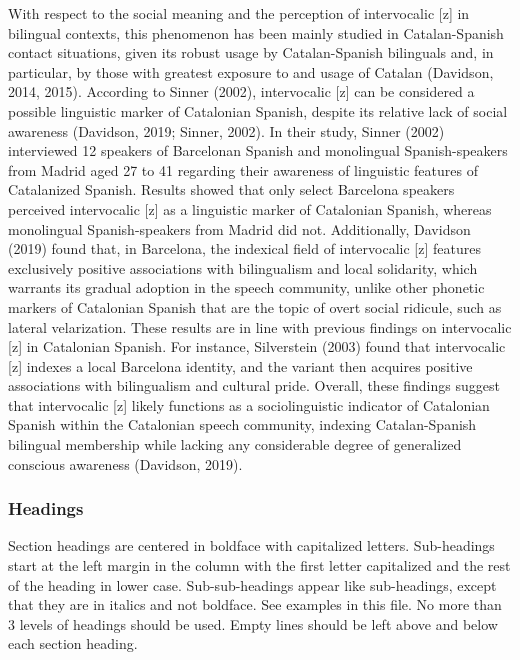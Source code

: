 \documentclass[
  a4paper,
  11pt,
  twocolumn]{article}
\begin{document}
With respect to the social meaning and the perception of intervocalic
{[}z{]} in bilingual contexts, this phenomenon has been mainly studied
in Catalan-Spanish contact situations, given its robust usage by
Catalan-Spanish bilinguals and, in particular, by those with greatest
exposure to and usage of Catalan (Davidson, 2014, 2015). According to
Sinner (2002), intervocalic {[}z{]} can be considered a possible
linguistic marker of Catalonian Spanish, despite its relative lack of
social awareness (Davidson, 2019; Sinner, 2002). In their study, Sinner
(2002) interviewed 12 speakers of Barcelonan Spanish and monolingual
Spanish-speakers from Madrid aged 27 to 41 regarding their awareness of
linguistic features of Catalanized Spanish. Results showed that only
select Barcelona speakers perceived intervocalic {[}z{]} as a linguistic
marker of Catalonian Spanish, whereas monolingual Spanish-speakers from
Madrid did not. Additionally, Davidson (2019) found that, in Barcelona,
the indexical field of intervocalic {[}z{]} features exclusively
positive associations with bilingualism and local solidarity, which
warrants its gradual adoption in the speech community, unlike other
phonetic markers of Catalonian Spanish that are the topic of overt
social ridicule, such as lateral velarization. These results are in line
with previous findings on intervocalic {[}z{]} in Catalonian Spanish.
For instance, Silverstein (2003) found that intervocalic {[}z{]} indexes
a local Barcelona identity, and the variant then acquires positive
associations with bilingualism and cultural pride. Overall, these
findings suggest that intervocalic {[}z{]} likely functions as a
sociolinguistic indicator of Catalonian Spanish within the Catalonian
speech community, indexing Catalan-Spanish bilingual membership while
lacking any considerable degree of generalized conscious awareness
(Davidson, 2019).

\subsubsection{Headings}

Section headings are centered in boldface with capitalized letters.
Sub-headings start at the left margin in the column with the first
letter capitalized and the rest of the heading in lower case.
Sub-sub-headings appear like sub-headings, except that they are in
italics and not boldface. See examples in this file. No more than 3
levels of headings should be used. Empty lines should be left above and
below each section heading.
\end{document}
